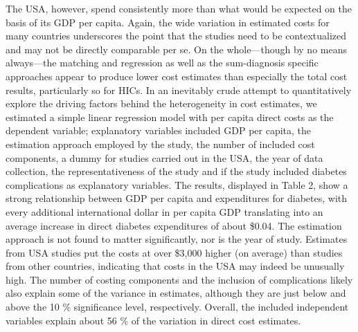 \documentclass[12pt,english]{article}
\begin{document}
The USA, however, spend consistently more than what would be expected on the basis of its \ac{GDP} per capita. Again, the wide variation in estimated costs for many countries underscores the point that the studies need to be contextualized and may not be directly comparable per se. On the whole---though by no means always---the matching and regression as well as the sum-diagnosis specific approaches appear to produce lower cost estimates than especially the total cost results, particularly so for \acp{HIC}. In an inevitably crude attempt to quantitatively explore the driving factors behind the heterogeneity in cost estimates, we estimated a simple linear regression model with per capita direct costs as the dependent variable; explanatory variables included \ac{GDP} per capita, the estimation approach employed by the study, the number of included cost components, a dummy for studies carried out in the USA, the year of data collection, the representativeness of the study and if the study included diabetes complications as explanatory variables. The results, displayed in Table 2, show a strong relationship between \ac{GDP} per capita and expenditures for diabetes, with every additional international dollar in per capita \ac{GDP} translating into an average increase in direct diabetes expenditures of about \$0.04. The estimation approach is not found to matter significantly, nor is the year of study. Estimates from USA studies put the costs at over \$3,000 higher (on average) than studies from other countries, indicating that costs in the USA may indeed be unusually high. The number of costing components and the inclusion of complications likely also explain some of the variance in estimates, although they are just below and above the 10 \% significance level, respectively. Overall, the included independent variables explain about 56 \% of the variation in direct cost estimates.  
\end{document}
